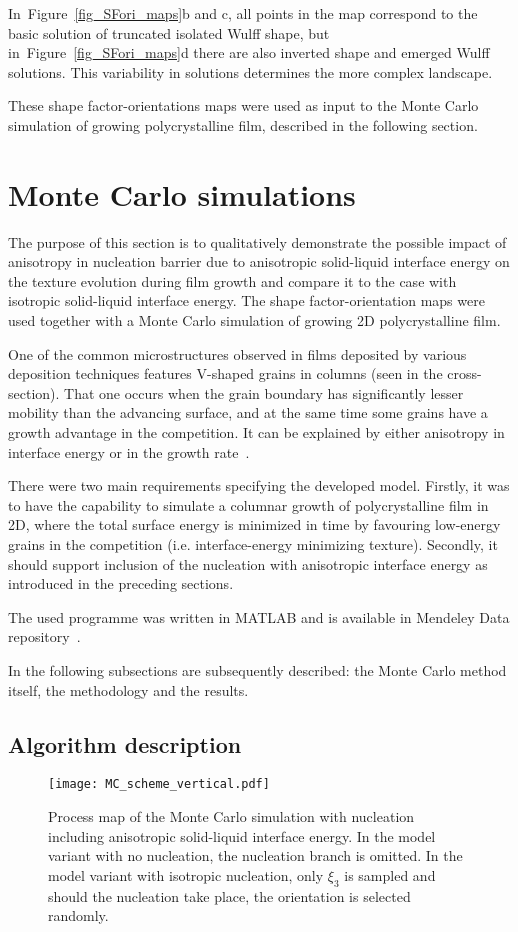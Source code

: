 	In~Figure~\ref{fig_SFori_maps}b and c, all points in the map correspond to the basic solution of truncated isolated Wulff shape, but in~Figure~\ref{fig_SFori_maps}d there are also inverted shape and emerged Wulff solutions. This variability in solutions determines the more complex landscape.
	
	These shape factor-orientations maps were used as input to the Monte Carlo simulation of growing polycrystalline film, described in the following section.

\section{Monte Carlo simulations}\label{sec_MC}
The purpose of this section is to qualitatively demonstrate the possible impact of anisotropy in nucleation barrier due to anisotropic solid-liquid interface energy on the texture evolution during film growth and compare it to the case with isotropic solid-liquid interface energy. The shape factor-orientation maps were used together with a Monte Carlo simulation of growing 2D polycrystalline film.

One of the common microstructures observed in films deposited by various deposition techniques features V-shaped grains in columns (seen in the cross-section). That one occurs when the grain boundary has significantly lesser mobility than the advancing surface, and at the same time some grains have a growth advantage in the competition. It can be explained by either anisotropy in interface energy or in the growth rate~\cite{Wendler2011}. 

There were two main requirements specifying the developed model. Firstly, it was to have the capability to simulate a columnar growth of polycrystalline film in 2D, where the total surface energy is minimized in time by favouring low-energy grains in the competition (i.e. interface-energy minimizing texture). Secondly, it should support inclusion of the nucleation with anisotropic interface energy as introduced in the preceding sections. 

The used programme was written in MATLAB and is available in Mendeley Data repository~\cite{Minar2023dataset}.

In the following subsections are subsequently described: the Monte Carlo method itself, the methodology and the results.

\subsection{Algorithm description}
\begin{figure}
	\centering
	\texttt{[image: MC\_scheme\_vertical.pdf]}
	\caption{Process map of the Monte Carlo simulation with nucleation including anisotropic solid-liquid interface energy. In the model variant with no nucleation, the nucleation branch is omitted. In the model variant with isotropic nucleation, only $\xi_3$ is sampled and should the nucleation take place, the orientation is selected randomly.}
	\label{fig_MCscheme}
\end{figure}

